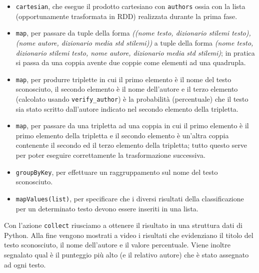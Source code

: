 \documentclass[titlepage]{article}
\begin{document}
\begin{itemize}
    \item \texttt{cartesian}, che esegue il prodotto cartesiano con 
    \texttt{authors} ossia con la lista (opportunamente trasformata in RDD) realizzata durante la prima fase.
    
    \item \texttt{map}, per passare da tuple della forma \textit{((nome testo, dizionario stilemi testo), (nome autore, dizionario media std stilemi))} a tuple della forma \textit{(nome testo, dizionario stilemi testo, nome autore, dizionario media std stilemi)}; in pratica si passa da una coppia avente due coppie come elementi ad una quadrupla.
    
    \item \texttt{map}, per produrre triplette in cui il primo elemento è il nome del testo sconosciuto, il secondo elemento è il nome dell'autore e il terzo elemento (calcolato usando \texttt{verify\_author}) è la probabilità (percentuale) che il testo sia stato scritto dall'autore indicato nel secondo elemento della tripletta.
    
    \item \texttt{map}, per passare da una tripletta ad una coppia in cui il primo elemento è il primo elemento della tripletta e il secondo elemento è un'altra coppia contenente il secondo ed il terzo elemento della tripletta; tutto questo serve per poter eseguire correttamente la trasformazione successiva.
    
    \item \texttt{groupByKey}, per effettuare un raggruppamento sul nome del testo sconosciuto.
    
    \item \texttt{mapValues(list)}, per specificare che i diversi risultati della classificazione per un determinato testo devono essere inseriti in una lista.
\end{itemize}
Con l'azione \texttt{collect} riusciamo a ottenere il risultato in una struttura dati di Python. Alla fine vengono mostrati a video i risultati che evidenziano il titolo del testo sconosciuto, il nome dell'autore e il valore percentuale. Viene inoltre segnalato qual è il punteggio più alto (e il relativo autore) che è stato assegnato ad ogni testo.
\end{document}
